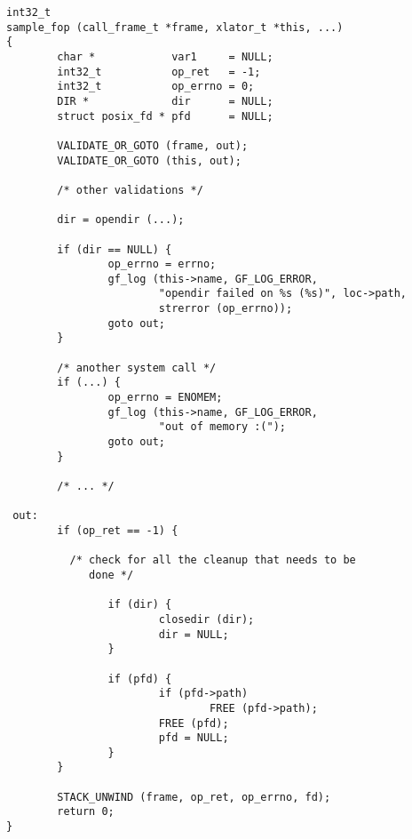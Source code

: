 \documentclass{article}[12pt]
\begin{document}
\begin{verbatim}
int32_t
sample_fop (call_frame_t *frame, xlator_t *this, ...)
{
        char *            var1     = NULL;
        int32_t           op_ret   = -1;
        int32_t           op_errno = 0;
        DIR *             dir      = NULL;
        struct posix_fd * pfd      = NULL;

        VALIDATE_OR_GOTO (frame, out);
        VALIDATE_OR_GOTO (this, out);

        /* other validations */

        dir = opendir (...);

        if (dir == NULL) {
                op_errno = errno;
                gf_log (this->name, GF_LOG_ERROR,
                        "opendir failed on %s (%s)", loc->path,
                        strerror (op_errno));
                goto out;
        }

        /* another system call */
        if (...) {
                op_errno = ENOMEM;
                gf_log (this->name, GF_LOG_ERROR,
                        "out of memory :(");
                goto out;
        }

        /* ... */

 out:
        if (op_ret == -1) {

          /* check for all the cleanup that needs to be
             done */

                if (dir) {
                        closedir (dir);
                        dir = NULL;
                }

                if (pfd) {
                        if (pfd->path)
                                FREE (pfd->path);
                        FREE (pfd);
                        pfd = NULL;
                }
        }

        STACK_UNWIND (frame, op_ret, op_errno, fd);
        return 0;
}
\end{verbatim}
\end{document}
